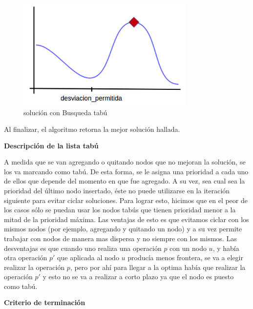 \begin{figure}[H] %
\begin{center}
\includegraphics[width=250pt]{../imgs/2_tabu.png}
\caption{solución con Busqueda tabú}
\end{center}
\end{figure}

Al finalizar, el algoritmo retorna la mejor solución hallada. \newline

\textbf{Descripción de la lista tabú} \newline

 A medida que se van agregando o quitando nodos que no mejoran la solución, se los va marcando como tabú. De esta forma, se le asigna una prioridad a cada uno de ellos que depende del momento en que fue agregado. A su vez, sea cual sea la prioridad del último nodo insertado, éste no puede utilizarse en la iteración siguiente para evitar ciclar soluciones. Para lograr esto, hicimos que en el peor de los casos sólo se puedan usar los nodos tabús que tienen prioridad menor a la mitad de la prioridad máxima. Las ventajas de esto es que evitamos ciclar con los mismos nodos (por ejemplo, agregando y quitando un nodo) y a su vez permite trabajar con nodos de manera mas dispersa y no siempre con los mismos. Las desventajas es que cuando uno realiza una operación $p$ con un nodo $u$, y había otra operación $p'$ que aplicada al nodo $u$ producía menos frontera, se va a elegir realizar la operación $p$, pero por ahí para llegar a la optima había que realizar la operación $p'$ y esto no se va a realizar a corto plazo ya que el nodo es puesto como tabú.\newline

\textbf{Criterio de terminación} \newline

